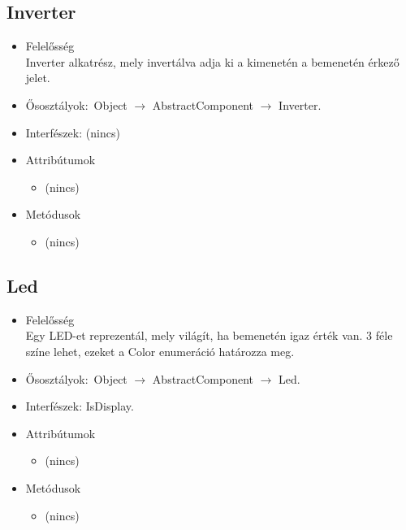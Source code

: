\subsection{Inverter}
\begin{itemize}
\item Felelősség\\
Inverter alkatrész, mely invertálva adja ki a kimenetén a bemenetén  érkező jelet.
\item Ősosztályok:\ Object $\rightarrow{}$ AbstractComponent $\rightarrow{}$ Inverter.
\item Interfészek: (nincs)
\item Attribútumok $\ $
\begin{itemize}
\item (nincs)
\end{itemize}
\item Metódusok$\ $
\begin{itemize}
\item (nincs)
\end{itemize}
\end{itemize}

\subsection{Led}
\begin{itemize}
\item Felelősség\\
Egy LED-et reprezentál, mely világít, ha bemenetén igaz érték van.  3 féle színe lehet, ezeket a Color enumeráció határozza meg.
\item Ősosztályok:\ Object $\rightarrow{}$ AbstractComponent $\rightarrow{}$ Led.
\item Interfészek: IsDisplay.
\item Attribútumok $\ $
\begin{itemize}
\item (nincs)
\end{itemize}
\item Metódusok$\ $
\begin{itemize}
\item (nincs)
\end{itemize}
\end{itemize}

